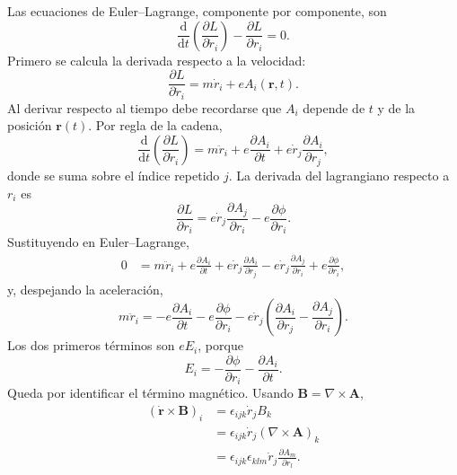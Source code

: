 \documentclass[11pt]{article}
\newcommand{\dd}{\mathrm{d}}
\newcommand{\vb}[1]{\mathbf{#1}}
\begin{document}
Las ecuaciones de Euler--Lagrange, componente por componente, son
\begin{equation}
  \frac{\dd}{\dd t}\left(\frac{\partial L}{\partial\dot r_i}\right)
  -
  \frac{\partial L}{\partial r_i}
  =
  0.
\end{equation}
Primero se calcula la derivada respecto a la velocidad:
\begin{equation}
  \frac{\partial L}{\partial\dot r_i}
  =
  m\dot r_i+eA_i(\vb r,t).
\end{equation}
Al derivar respecto al tiempo debe recordarse que \(A_i\) depende de \(t\) y de
la posici\'on \(\vb r(t)\). Por regla de la cadena,
\begin{equation}
  \frac{\dd}{\dd t}
  \left(\frac{\partial L}{\partial\dot r_i}\right)
  =
  m\ddot r_i
  +e\frac{\partial A_i}{\partial t}
  +e\dot r_j\frac{\partial A_i}{\partial r_j},
\end{equation}
donde se suma sobre el \'indice repetido \(j\). La derivada del lagrangiano
respecto a \(r_i\) es
\begin{equation}
  \frac{\partial L}{\partial r_i}
  =
  e\dot r_j\frac{\partial A_j}{\partial r_i}
  -e\frac{\partial\phi}{\partial r_i}.
\end{equation}
Sustituyendo en Euler--Lagrange,
\begin{align}
  0
  &=
  m\ddot r_i
  +e\frac{\partial A_i}{\partial t}
  +e\dot r_j\frac{\partial A_i}{\partial r_j}
  -e\dot r_j\frac{\partial A_j}{\partial r_i}
  +e\frac{\partial\phi}{\partial r_i},
\end{align}
y, despejando la aceleraci\'on,
\begin{equation}
  m\ddot r_i
  =
  -e\frac{\partial A_i}{\partial t}
  -e\frac{\partial\phi}{\partial r_i}
  -e\dot r_j
  \left(
    \frac{\partial A_i}{\partial r_j}
    -
    \frac{\partial A_j}{\partial r_i}
  \right).
\end{equation}
Los dos primeros t\'erminos son \(eE_i\), porque
\begin{equation}
  E_i
  =
  -\frac{\partial\phi}{\partial r_i}
  -
  \frac{\partial A_i}{\partial t}.
\end{equation}
Queda por identificar el t\'ermino magn\'etico. Usando
\(\vb B=\nabla\times\vb A\),
\begin{align}
  \left(\dot{\vb r}\times\vb B\right)_i
  &=
  \epsilon_{ijk}\dot r_j B_k                                                   \\
  &=
  \epsilon_{ijk}\dot r_j(\nabla\times\vb A)_k                                  \\
  &=
  \epsilon_{ijk}\epsilon_{klm}\dot r_j
  \frac{\partial A_m}{\partial r_l}.
\end{align}
\end{document}
